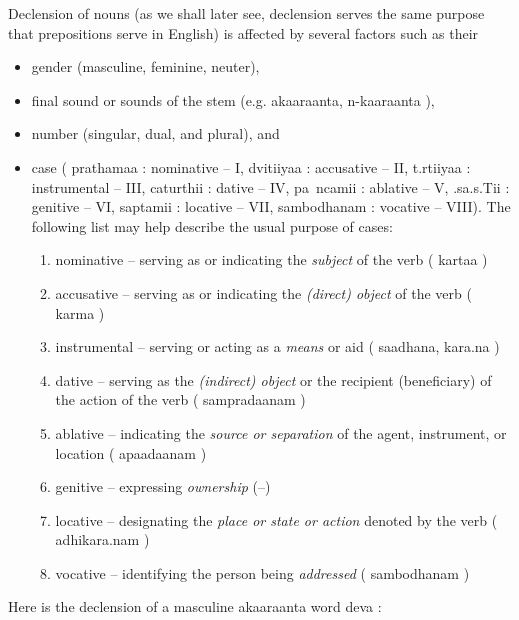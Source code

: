 \documentclass[a4paper, 12pt]{article}
\newcommand \sans[1]{
    \textsanskrit{#1}
}
\begin{document}
    Declension of nouns (as we shall later see, declension serves the same purpose that prepositions serve in English) is affected by several factors such as 
    their 
    \begin{itemize}
        \item gender (masculine, feminine, neuter), 
        \item final sound or sounds of the stem (e.g. \sans{akaaraanta, n-kaaraanta}), 
        \item number (singular, dual, and plural), and 
        \item case (\sans{prathamaa}: nominative -- I, \sans{dvitiiyaa}: accusative -- II, \sans{t.rtiiyaa}: instrumental -- III, \sans{caturthii}: dative -- IV, \sans{pa~ncamii}: ablative -- V, \sans{.sa.s.Tii}: genitive -- VI, \sans{saptamii}: locative -- VII, \sans{sambodhanam}: vocative -- VIII). The following list may help describe the usual purpose of cases:
            \begin{enumerate}
                \item nominative -- serving as or indicating the \emph{subject} of the verb (\sans{kartaa})
                \item accusative -- serving as or indicating the \emph{(direct) object} of the verb (\sans{karma})
                \item instrumental -- serving or acting as a \emph{means} or aid (\sans{saadhana, kara.na})
                \item dative -- serving as the \emph{(indirect) object} or the recipient (beneficiary) of the action of the verb (\sans{sampradaanam})
                \item ablative -- indicating the \emph{source or separation} of the agent, instrument, or location (\sans{apaadaanam})
                \item genitive -- expressing \emph{ownership} (--)
                \item locative -- designating the \emph{place or state or action} denoted by the verb (\sans{adhikara.nam})
                \item vocative -- identifying the person being \emph{addressed} (\sans{sambodhanam})
            \end{enumerate}
    \end{itemize}

    Here is the declension of a masculine \sans{akaaraanta} word \sans{deva}:
\end{document}
